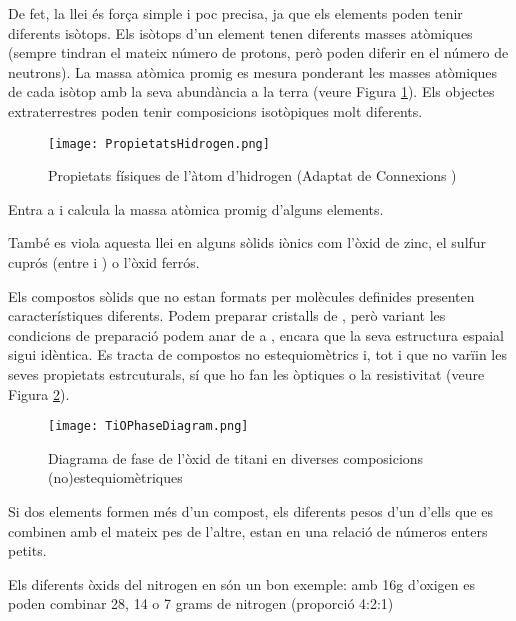 De fet, la llei és força simple i poc precisa, ja que els elements poden tenir diferents isòtops.
Els isòtops d'un element tenen diferents masses atòmiques (sempre tindran el mateix número de protons, però poden diferir en el número de neutrons). La massa atòmica promig es mesura ponderant les masses atòmiques de cada isòtop amb la seva abundància a la terra (veure Figura \ref{fig:PropietatsHidrogen}).
Els objectes extraterrestres poden tenir composicions isotòpiques molt diferents.
\begin{figure}[h]
\centering
\texttt{[image: PropietatsHidrogen.png]}
\caption{Propietats físiques de l'àtom d'hidrogen (Adaptat de Connexions )}
\label{fig:PropietatsHidrogen}
\end{figure}
\begin{exr}
Entra a  i calcula la massa atòmica promig d'alguns elements.
\end{exr}
També es viola aquesta llei en alguns sòlids iònics com l'òxid de zinc, el sulfur cuprós (entre  i ) o l'òxid ferrós.

Els compostos sòlids que no estan formats per molècules definides presenten característiques diferents. Podem preparar cristalls de , però variant les condicions de preparació podem anar de  a , encara que la seva estructura espaial sigui idèntica. Es tracta de compostos no estequiomètrics i, tot i que no varïin les seves propietats estrcuturals, sí que ho fan les òptiques o la resistivitat (veure Figura \ref{fig:TiOPhaseDiagram}).
\begin{figure}[h]
\centering
\texttt{[image: TiOPhaseDiagram.png]}
\caption{Diagrama de fase de l'òxid de titani en diverses composicions (no)estequiomètriques\citep{de_vries_phase_1954}}
\label{fig:TiOPhaseDiagram}
\end{figure}

\begin{mdframed}[backgroundcolor=gray!30,frametitle=Llei de les proporcions múltiples]
Si dos elements formen més d'un compost, els diferents pesos d'un d'ells que es combinen amb el mateix pes de l'altre, estan en una relació de números enters petits.
\end{mdframed}

Els diferents òxids del nitrogen en són un bon exemple: amb 16g d'oxigen es poden combinar 28, 14 o 7 grams de nitrogen (proporció 4:2:1)

